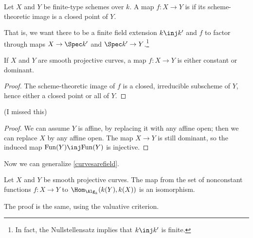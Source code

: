 \begin{defn}
Let $X$ and $Y$ be finite-type schemes over $k$. A map $f\colon X\to Y$ is  if its scheme-theoretic
image is a closed point of $Y$.
\end{defn}
That is, we want there to be a finite field extension $k\inj k'$ and $f$ to factor through maps $X\to\Spec k'$ and
$\Spec k'\to Y$.\footnote{In fact, the Nullstellensatz implies that $k\inj k'$ is finite.}
\begin{prop}
If $X$ and $Y$ are smooth projective curves, a map $f\colon X\to Y$ is either constant or dominant.
\end{prop}
\begin{proof}
The scheme-theoretic image of $f$ is a closed, irreducible subscheme of $Y$, hence either a closed point or all of
$Y$.
\end{proof}
\begin{prop}
\TODO (I missed this)
\end{prop}
\begin{proof}
We can assume $Y$ is affine, by replacing it with any affine open; then we can replace $X$ by any affine open. The
map $X\to Y$ is still dominant, so the induced map $\Fun(Y)\inj\Fun(Y)$ is injective.
\end{proof}
Now we can generalize \cref{curvesarefield}.
\begin{prop}
Let $X$ and $Y$ be smooth projective curves. The map from the set of nonconstant functions $f\colon X\to Y$ to
$\Hom_{\Alg_k}(k(Y), k(X))$ is an isomorphism.
\end{prop}
The proof is the same, using the valuative criterion.
